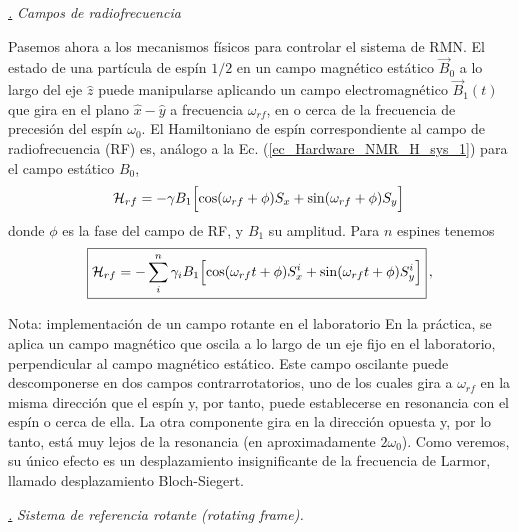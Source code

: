 \documentclass[a4paper,11pt]{book} %
\numberwithin{equation}{chapter}
\def\Lc{\Bigl[}
\def\Rc{\Bigr]}
\def\subsubiContadorIt{\par\addtocounter{subsubsection}{1}\underline{\it\thesubsubsection.}\hskip0.5cm \setcounter{subsubsubsectionIt}{0}}
\newcommand{\SubsubiIt}[1]{
		\subsubiContadorIt \textit{#1}
	}
\newcounter{subsubsubsectionIt}[subsubsection]
\begin{document}
			\SubsubiIt{Campos de radiofrecuencia}

Pasemos ahora a los mecanismos físicos para controlar el sistema de RMN. El estado de una partícula de espín $1/2$ en un campo magnético estático $\vec{B}_0$ a lo largo del eje $\hat{z}$ puede manipularse aplicando un campo electromagnético $\vec{B}_1(t)$ que gira en el plano $\hat{x}-\hat{y}$ a frecuencia $\omega_{rf}$, en o cerca de la frecuencia de precesión del espín $\omega_0$. El Hamiltoniano de espín  correspondiente al campo de radiofrecuencia (RF) es, análogo a la Ec. (\ref{ec_Hardware_NMR_H_sys_1}) para el campo estático $B_0$,
	\begin{equation} 
	\mathcal{H}_{rf} = - \gamma B_1 \Lc \cos (\omega_{rf} + \phi) S_x + \sin (\omega_{rf} + \phi) S_y \Rc \,
	\end{equation}
donde $\phi$ es la fase del campo de RF, y $B_1$ su amplitud. Para $n$ espines tenemos
	\begin{equation} \label{ec_Hardware_NMR_H_rf}
	\boxed{\mathcal{H}_{rf} = - \sum_{i}^n \gamma_i B_1 \Lc \cos (\omega_{rf} t + \phi) S_x^i + \sin (\omega_{rf} t+ \phi ) S_y^i \Rc} \, ,
	\end{equation}
	
	\begin{mybox_blue}{Nota: implementación de un campo rotante en el laboratorio}
	En la práctica, se aplica un campo magnético que oscila a lo largo de un eje fijo en el
	laboratorio, perpendicular al campo magnético estático. Este campo oscilante puede
	descomponerse en dos campos contrarrotatorios, uno de los cuales gira a $\omega_{rf}$ en la
	misma dirección que el espín y, por tanto, puede establecerse en resonancia con el espín o
	cerca de ella. La  otra componente gira en la dirección opuesta y, por lo tanto, está muy 
	lejos de la resonancia (en aproximadamente $2\omega_0$). Como veremos, su único efecto es un
	desplazamiento insignificante de la frecuencia de Larmor, llamado desplazamiento Bloch-Siegert.
	\end{mybox_blue}

			\SubsubiIt{Sistema de referencia rotante (\textit{rotating frame}).} 
			
\end{document}
